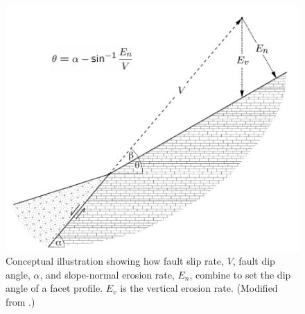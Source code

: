 \begin{figure}[ht!]
\centerline{\includegraphics{figure4.pdf}}
\caption{Conceptual illustration showing how fault slip rate, $V$, fault dip angle, $\alpha$, and slope-normal erosion rate, $E_n$, combine to set the dip angle of a facet profile. $E_v$ is the vertical erosion rate. (Modified from \citet{tucker2011geomorphic}.)} 
\label{fig:facetschem}
\end{figure}

